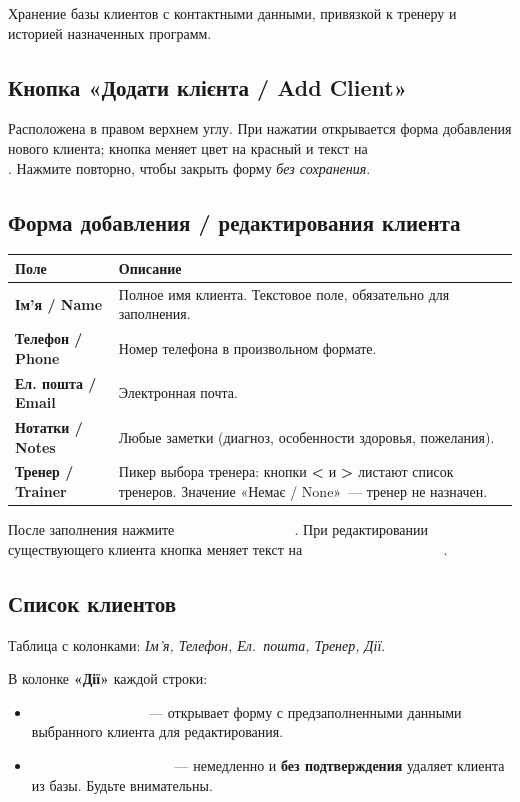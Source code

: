 \documentclass[12pt,a4paper]{article}
\newcommand{\btn}[2][primary]{%
  \textcolor{white}{\colorbox{#1}{\small\bfseries\,#2\,}}%
}
\newcommand{\btnred}[1]{\btn[danger]{#1}}
\begin{document}
Хранение базы клиентов с контактными данными, привязкой к тренеру
и историей назначенных программ.

\subsection{Кнопка «Додати клієнта / Add Client»}

Расположена в правом верхнем углу. При нажатии открывается форма
добавления нового клиента; кнопка меняет цвет на красный и текст
на \btnred{Скасувати / Cancel}. Нажмите повторно, чтобы закрыть
форму \emph{без сохранения}.

\subsection{Форма добавления / редактирования клиента}

\begin{center}
\begin{tabularx}{0.9\textwidth}{>{\bfseries}lX}
  \toprule
  Поле & Описание \\
  \midrule
  Ім'я / Name &
    Полное имя клиента. Текстовое поле, обязательно для заполнения. \\
  Телефон / Phone &
    Номер телефона в произвольном формате. \\
  Ел. пошта / Email &
    Электронная почта. \\
  Нотатки / Notes &
    Любые заметки (диагноз, особенности здоровья, пожелания). \\
  Тренер / Trainer &
    Пикер выбора тренера: кнопки \textbf{<} и \textbf{>} листают
    список тренеров. Значение «Немає / None»~--- тренер не назначен. \\
  \bottomrule
\end{tabularx}
\end{center}

\medskip
\noindent После заполнения нажмите \btn{Зберегти / Save}.
При редактировании существующего клиента кнопка меняет текст
на \btn{Оновити / Update}.

\subsection{Список клиентов}

Таблица с колонками: \textit{Ім'я, Телефон, Ел.~пошта, Тренер, Дії}.

В колонке \textbf{«Дії»} каждой строки:
\begin{itemize}
  \item \btn{Змінити / Edit}~--- открывает форму с предзаполненными
    данными выбранного клиента для редактирования.
  \item \btnred{Видалити / Delete}~--- немедленно и \textbf{без
    подтверждения} удаляет клиента из базы.
    Будьте внимательны.
\end{itemize}
\end{document}
